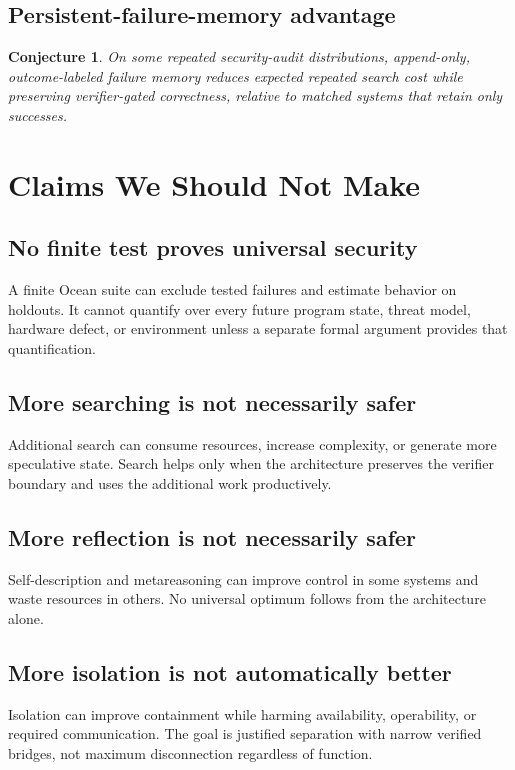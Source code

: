 \documentclass[11pt,oneside]{book}
\newtheorem{conjecture}[theorem]{Conjecture}
\theoremstyle{definition}
\theoremstyle{remark}
\begin{document}
\section{Persistent-failure-memory advantage}
\begin{conjecture}
On some repeated security-audit distributions, append-only, outcome-labeled failure memory reduces expected repeated search cost while preserving verifier-gated correctness, relative to matched systems that retain only successes.
\end{conjecture}

\chapter{Claims We Should Not Make}
\label{ch:limits}
\section{No finite test proves universal security}
A finite Ocean suite can exclude tested failures and estimate behavior on holdouts. It cannot quantify over every future program state, threat model, hardware defect, or environment unless a separate formal argument provides that quantification.

\section{More searching is not necessarily safer}
Additional search can consume resources, increase complexity, or generate more speculative state. Search helps only when the architecture preserves the verifier boundary and uses the additional work productively.

\section{More reflection is not necessarily safer}
Self-description and metareasoning can improve control in some systems and waste resources in others. No universal optimum follows from the architecture alone.

\section{More isolation is not automatically better}
Isolation can improve containment while harming availability, operability, or required communication. The goal is justified separation with narrow verified bridges, not maximum disconnection regardless of function.
\end{document}
